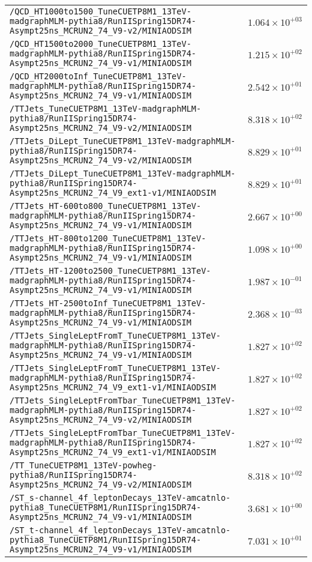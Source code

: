 \begin{center}
\begin{tabular}{ll}
\verb!/QCD_HT1000to1500_TuneCUETP8M1_13TeV-madgraphMLM-pythia8/RunIISpring15DR74-Asympt25ns_MCRUN2_74_V9-v2/MINIAODSIM! &$1.064\times 10^{+03}$\tabularnewline
\verb!/QCD_HT1500to2000_TuneCUETP8M1_13TeV-madgraphMLM-pythia8/RunIISpring15DR74-Asympt25ns_MCRUN2_74_V9-v1/MINIAODSIM! &$1.215\times 10^{+02}$\tabularnewline
\verb!/QCD_HT2000toInf_TuneCUETP8M1_13TeV-madgraphMLM-pythia8/RunIISpring15DR74-Asympt25ns_MCRUN2_74_V9-v1/MINIAODSIM! &$2.542\times 10^{+01}$\tabularnewline
\verb!/TTJets_TuneCUETP8M1_13TeV-madgraphMLM-pythia8/RunIISpring15DR74-Asympt25ns_MCRUN2_74_V9-v2/MINIAODSIM! &$8.318\times 10^{+02}$\tabularnewline
\verb!/TTJets_DiLept_TuneCUETP8M1_13TeV-madgraphMLM-pythia8/RunIISpring15DR74-Asympt25ns_MCRUN2_74_V9-v2/MINIAODSIM! &$8.829\times 10^{+01}$\tabularnewline
\verb!/TTJets_DiLept_TuneCUETP8M1_13TeV-madgraphMLM-pythia8/RunIISpring15DR74-Asympt25ns_MCRUN2_74_V9_ext1-v1/MINIAODSIM! &$8.829\times 10^{+01}$\tabularnewline
\verb!/TTJets_HT-600to800_TuneCUETP8M1_13TeV-madgraphMLM-pythia8/RunIISpring15DR74-Asympt25ns_MCRUN2_74_V9-v1/MINIAODSIM! &$2.667\times 10^{+00}$\tabularnewline
\verb!/TTJets_HT-800to1200_TuneCUETP8M1_13TeV-madgraphMLM-pythia8/RunIISpring15DR74-Asympt25ns_MCRUN2_74_V9-v1/MINIAODSIM! &$1.098\times 10^{+00}$\tabularnewline
\verb!/TTJets_HT-1200to2500_TuneCUETP8M1_13TeV-madgraphMLM-pythia8/RunIISpring15DR74-Asympt25ns_MCRUN2_74_V9-v1/MINIAODSIM! &$1.987\times 10^{-01}$\tabularnewline
\verb!/TTJets_HT-2500toInf_TuneCUETP8M1_13TeV-madgraphMLM-pythia8/RunIISpring15DR74-Asympt25ns_MCRUN2_74_V9-v1/MINIAODSIM! &$2.368\times 10^{-03}$\tabularnewline
\verb!/TTJets_SingleLeptFromT_TuneCUETP8M1_13TeV-madgraphMLM-pythia8/RunIISpring15DR74-Asympt25ns_MCRUN2_74_V9-v1/MINIAODSIM! &$1.827\times 10^{+02}$\tabularnewline
\verb!/TTJets_SingleLeptFromT_TuneCUETP8M1_13TeV-madgraphMLM-pythia8/RunIISpring15DR74-Asympt25ns_MCRUN2_74_V9_ext1-v1/MINIAODSIM! &$1.827\times 10^{+02}$\tabularnewline
\verb!/TTJets_SingleLeptFromTbar_TuneCUETP8M1_13TeV-madgraphMLM-pythia8/RunIISpring15DR74-Asympt25ns_MCRUN2_74_V9-v2/MINIAODSIM! &$1.827\times 10^{+02}$\tabularnewline
\verb!/TTJets_SingleLeptFromTbar_TuneCUETP8M1_13TeV-madgraphMLM-pythia8/RunIISpring15DR74-Asympt25ns_MCRUN2_74_V9_ext1-v1/MINIAODSIM! &$1.827\times 10^{+02}$\tabularnewline
\verb!/TT_TuneCUETP8M1_13TeV-powheg-pythia8/RunIISpring15DR74-Asympt25ns_MCRUN2_74_V9-v2/MINIAODSIM! &$8.318\times 10^{+02}$\tabularnewline
\verb!/ST_s-channel_4f_leptonDecays_13TeV-amcatnlo-pythia8_TuneCUETP8M1/RunIISpring15DR74-Asympt25ns_MCRUN2_74_V9-v1/MINIAODSIM! &$3.681\times 10^{+00}$\tabularnewline
\verb!/ST_t-channel_4f_leptonDecays_13TeV-amcatnlo-pythia8_TuneCUETP8M1/RunIISpring15DR74-Asympt25ns_MCRUN2_74_V9-v1/MINIAODSIM! &$7.031\times 10^{+01}$\tabularnewline

\end{tabular}
\end{center}
